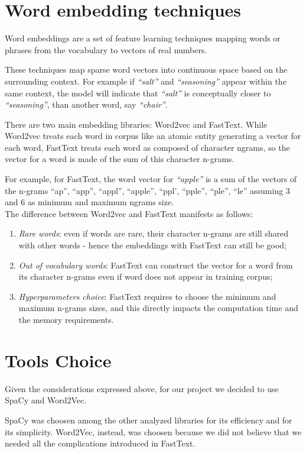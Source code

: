 \section{Word embedding techniques}
Word embeddings are a set of feature learning techniques mapping words or phrases from the vocabulary to vectors of real numbers. \par
These techniques map sparse word vectors into continuous space based on the surrounding context. For example if \textit{``salt''} and \textit{``seasoning''} appear within the same context, the model will indicate that \textit{``salt''} is conceptually closer to \textit{``seasoning''}, than another word, say \textit{``chair''}.\par
There are two main embedding libraries: Word2vec\cite{word2vec} and FastText\cite{fasttext}. While Word2vec treats each word in corpus like an atomic entity generating a vector for each word\cite{word2vec}, FastText treats each word as composed of character ngrams, so the vector for a word is made of the sum of this character n-grams\cite{fasttext}. \par
For example, for FastText,  the word vector for \textit{``apple''} is a sum of the vectors of the n-grams ``ap'', ``app'', ``appl'', ``apple'', ``ppl', ``pple'', ``ple'', ``le'' assuming 3 and 6 as minimum and maximum ngrams size.\\
The difference between Word2vec and FastText manifests as follows:
\begin{enumerate}
\item \textit{Rare words}: even if words are rare, their character n-grams are still shared with other words - hence the embeddings with FastText can still be good;
\item \textit{Out of vocabulary words}: FastText can construct the vector for a word from its character n-grams even if word does not appear in training corpus;
\item \textit{Hyperparameters choice}: FastText requires to  choose the minimum and maximum n-grams sizes, and this directly impacts the computation time and the memory requirements. 
\end{enumerate}

\section{Tools Choice}

Given the considerations expressed above, for our project we decided to use SpaCy and Word2Vec.

SpaCy was choosen among the other analyzed libraries for its efficiency and for its simplicity. Word2Vec, instead, was choosen because we did not believe that we needed all the complications introduced in FastText.